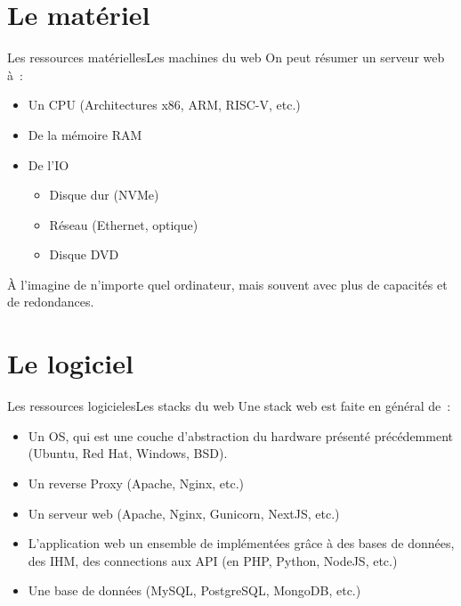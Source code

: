 \documentclass{beamer}
\begin{document}
    \section{Le matériel}\label{sec:le-materielle}

    \begin{frame}{Les ressources matérielles}{Les machines du web}
        On peut résumer un serveur web à~:
        \begin{itemize}
            \item Un CPU (Architectures x86, ARM, RISC-V, etc.)
            \item De la mémoire RAM
            \item De l'IO
            \begin{itemize}
                \item Disque dur (NVMe)
                \item Réseau (Ethernet, optique)
                \item Disque DVD
            \end{itemize}
        \end{itemize}
        À l'imagine de n'importe quel ordinateur, mais souvent avec plus de capacités et de redondances.
    \end{frame}


    \section{Le logiciel}\label{sec:le-logiciel}

    \begin{frame}{Les ressources logicieles}{Les stacks du web}
        Une stack web est faite en général de~:
        \begin{itemize}
            \item Un OS, qui est une couche d'abstraction du hardware présenté précédemment (Ubuntu, Red Hat, Windows, BSD).
            \item Un reverse Proxy (Apache, Nginx, etc.)
            \item Un serveur web (Apache, Nginx, Gunicorn, NextJS, etc.)
            \item L'application web un ensemble de  implémentées grâce à des bases de données, des IHM, des connections aux API (en PHP, Python, NodeJS, etc.)
            \item Une base de données (MySQL, PostgreSQL, MongoDB, etc.)
        \end{itemize}
    \end{frame}
\end{document}
